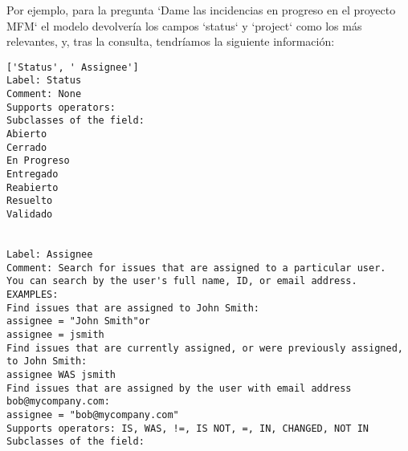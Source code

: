 Por ejemplo, para la pregunta `Dame las incidencias en progreso en el proyecto MFM` el modelo devolvería los campos `status` y `project` como los más relevantes, y, tras la consulta, tendríamos la siguiente información:

\begin{small}
\begin{verbatim}
['Status', ' Assignee']
Label: Status
Comment: None
Supports operators:
Subclasses of the field:
Abierto
Cerrado
En Progreso
Entregado
Reabierto
Resuelto
Validado


Label: Assignee
Comment: Search for issues that are assigned to a particular user. 
You can search by the user's full name, ID, or email address.
EXAMPLES:
Find issues that are assigned to John Smith:
assignee = "John Smith"or
assignee = jsmith
Find issues that are currently assigned, or were previously assigned, 
to John Smith:
assignee WAS jsmith
Find issues that are assigned by the user with email address 
bob@mycompany.com:
assignee = "bob@mycompany.com"
Supports operators: IS, WAS, !=, IS NOT, =, IN, CHANGED, NOT IN
Subclasses of the field:
\end{verbatim}
\end{small}